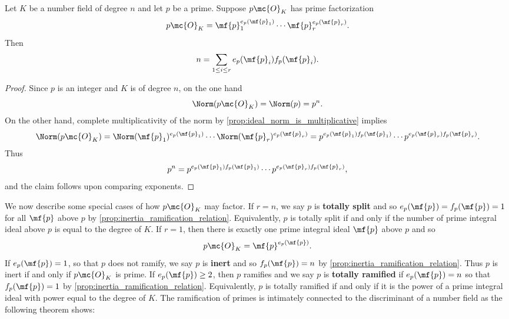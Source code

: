     \begin{proposition}\label{prop:inertia_ramification_relation}
      Let $K$ be a number field of degree $n$ and let $p$ be a prime. Suppose $p\mc{O}_{K}$ has prime factorization
      \[
        p\mc{O}_{K} = \mf{p}_{1}^{e_{p}(\mf{p}_{1})} \cdots \mf{p}_{r}^{e_{p}(\mf{p}_{r})}.
      \]
      Then
      \[
        n = \sum_{1 \le i \le r}e_{p}(\mf{p}_{i})f_{p}(\mf{p}_{i}).
      \]
    \end{proposition}
    \begin{proof}
      Since $p$ is an integer and $K$ is of degree $n$, on the one hand
      \[
        \Norm(p\mc{O}_{K}) = \Norm(p) = p^{n}.
      \]
      On the other hand, complete multiplicativity of the norm by \cref{prop:ideal_norm_is_multiplicative} implies
      \[
        \Norm(p\mc{O}_{K}) = \Norm(\mf{p}_{1})^{e_{p}(\mf{p}_{1})} \cdots \Norm(\mf{p}_{r})^{e_{p}(\mf{p}_{r})} = p^{e_{p}(\mf{p}_{1})f_{p}(\mf{p}_{1})} \cdots p^{e_{p}(\mf{p}_{r})f_{p}(\mf{p}_{r})}.
      \]
      Thus
      \[
        p^{n} = p^{e_{p}(\mf{p}_{1})f_{p}(\mf{p}_{1})} \cdots p^{e_{p}(\mf{p}_{r})f_{p}(\mf{p}_{r})},
      \]
      and the claim follows upon comparing exponents.
    \end{proof}

    We now describe some special cases of how $p\mc{O}_{K}$ may factor. If $r = n$, we say $p$ is \textbf{totally split} and so $e_{p}(\mf{p}) = f_{p}(\mf{p}) = 1$ for all $\mf{p}$ above $p$ by \cref{prop:inertia_ramification_relation}. Equivalently, $p$ is totally split if and only if the number of prime integral ideal above $p$ is equal to the degree of $K$. If $r = 1$, then there is exactly one prime integral ideal $\mf{p}$ above $p$ and so
    \[
      p\mc{O}_{K} = \mf{p}^{e_{p}(\mf{p})}.
    \]
    If $e_{p}(\mf{p}) = 1$, so that $p$ does not ramify, we say $p$ is \textbf{inert} and so $f_{p}(\mf{p}) = n$ by \cref{prop:inertia_ramification_relation}. Thus $p$ is inert if and only if $p\mc{O}_{K}$ is prime. If $e_{p}(\mf{p}) \ge 2$, then $p$ ramifies and we say $p$ is \textbf{totally ramified} if $e_{p}(\mf{p}) = n$ so that $f_{p}(\mf{p}) = 1$ by \cref{prop:inertia_ramification_relation}. Equivalently, $p$ is totally ramified if and only if it is the power of a prime integral ideal with power equal to the degree of $K$. The ramification of primes is intimately connected to the discriminant of a number field as the following theorem shows:

